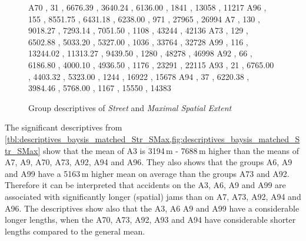 \begin{figure}[ht!]
\begin{minipage}{0.55\textwidth}
{			A70 , 31  , 6676.39  , 3640.24  , 6136.00  , 1841 , 13058 , 11217 
			A96 , 155 , 8551.75  , 6431.18  , 6238.00  , 971  , 27965 , 26994 
			A7  , 130 , 9018.27  , 7293.14  , 7051.50  , 1108 , 43244 , 42136 
			A73 , 129 , 6502.88  , 5033.20  , 5327.00  , 1036 , 33764 , 32728 
			A99 , 116 , 13244.02 , 11313.27 , 9439.50  , 1280 , 48278 , 46998 
			A92 , 66  , 6186.80  , 4000.10  , 4936.50  , 1176 , 23291 , 22115 
			A93 , 21  , 6765.00  , 4403.32  , 5323.00  , 1244 , 16922 , 15678 
			A94 , 37  , 6220.38  , 3984.46  , 5768.00  , 1167 , 15550 , 14383   
		}\data
		\pgfplotstablesort[sort key=mean, sort cmp=float >]{\datasorted}{\data}
		\tiny
		\centering
		\label{fig:descriptives_baysis_matched_Str_SMax}
	\end{minipage}%
	\caption{Group descriptives of \textit{Street} and \textit{Maximal Spatial Extent}}
\end{figure}
The significant descriptives from \cref{tbl:descriptives_baysis_matched_Str_SMax,fig:descriptives_baysis_matched_Str_SMax} show that the mean of A3 is 3194\,m - 7688\,m higher than the means of A7, A9, A70, A73, A92, A94 and A96. They also shows that the groups A6, A9 and A99 have a 5163\,m higher mean on average than the groups A73 and A92. Therefore it can be interpreted that accidents on the A3, A6, A9 and A99 are associated with significantly longer (spatial) jams than on A7, A73, A92, A94 and A96. The descriptives show also that the A3, A6 A9 and A99 have a considerable longer lengths, when the A70, A73, A92, A93 and A94 have considerable shorter lengths compared to the general mean.
